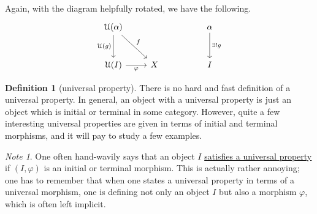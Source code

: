 \documentclass[a4paper,10pt]{scrreprt}
\newcommand{\defn}[1]{\ul{#1}}
\theoremstyle{definition}
\newtheorem{definition}{Definition}[section]
\theoremstyle{plain}
\theoremstyle{remark}
\newtheorem{note}{Note}[section]
\begin{document}
Again, with the diagram helpfully rotated, we have the following.
\begin{equation*}
  \begin{tikzcd}[row sep=large]
    \mathcal{U}(\alpha) \arrow[d, swap, "\mathcal{U}(g)"] \arrow[rd, "f"] & & & \alpha \arrow[d, "\exists!g"]\\
    \mathcal{U}(I) \arrow[r, swap, "\varphi"] & X & & I
  \end{tikzcd}
\end{equation*}
\begin{definition}[universal property]
  \label{def:universalproperty}
  There is no hard and fast definition of a universal property. In general, an object with a universal property is just an object which is initial or terminal in some category. However, quite a few interesting universal properties are given in terms of initial and terminal morphisms, and it will pay to study a few examples.
\end{definition}

\begin{note}
  One often hand-wavily says that an object $I$ \defn{satisfies a universal property} if $(I, \varphi)$ is an initial or terminal morphism. This is actually rather annoying; one has to remember that when one states a universal property in terms of a universal morphism, one is defining not only an object $I$ but also a morphism $\varphi$, which is often left implicit.
\end{note}
\end{document}
